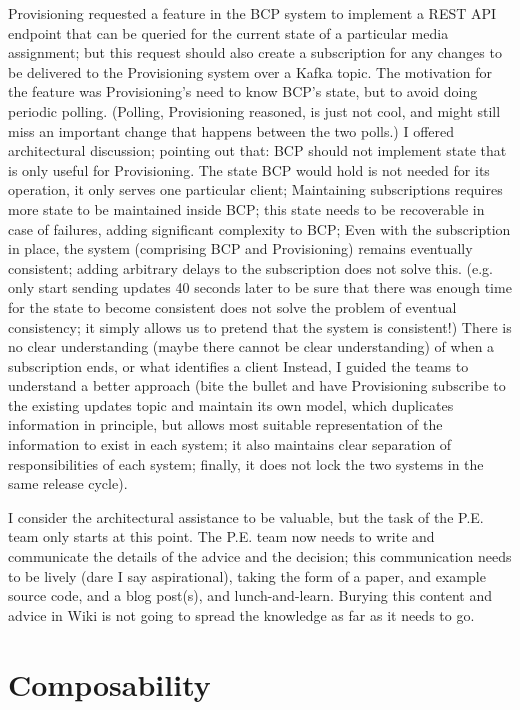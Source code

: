 Provisioning requested a feature in the BCP system to implement a REST API endpoint that can be queried for the current state of a particular media assignment; but this request should also create a subscription for any changes to be delivered to the Provisioning system over a Kafka topic. The motivation for the feature was Provisioning’s need to know BCP’s state, but to avoid doing periodic polling. (Polling, Provisioning reasoned, is just not cool, and might still miss an important change that happens between the two polls.)
I offered architectural discussion; pointing out that:
BCP should not implement state that is only useful for Provisioning. The state BCP would hold is not needed for its operation, it only serves one particular client;
Maintaining subscriptions requires more state to be maintained inside BCP; this state needs to be recoverable in case of failures, adding significant complexity to BCP;
Even with the subscription in place, the system (comprising BCP and Provisioning) remains eventually consistent; adding arbitrary delays to the subscription does not solve this. (e.g. only start sending updates 40 seconds later to be sure that there was enough time for the state to become consistent does not solve the problem of eventual consistency; it simply allows us to pretend that the system is consistent!)
There is no clear understanding (maybe there cannot be clear understanding) of when a subscription ends, or what identifies a client
Instead, I guided the teams to understand a better approach (bite the bullet and have Provisioning subscribe to the existing updates topic and maintain its own model, which duplicates information in principle, but allows most suitable representation of the information to exist in each system; it also maintains clear separation of responsibilities of each system; finally, it does not lock the two systems in the same release cycle).

I consider the architectural assistance to be valuable, but the task of the P.E. team only starts at this point. The P.E. team now needs to write and communicate the details of the advice and the decision; this communication needs to be lively (dare I say aspirational), taking the form of a paper, and example source code, and a blog post(s), and lunch-and-learn. Burying this content and advice in Wiki is not going to spread the knowledge as far as it needs to go.


\section{Composability}


\printbibliography

